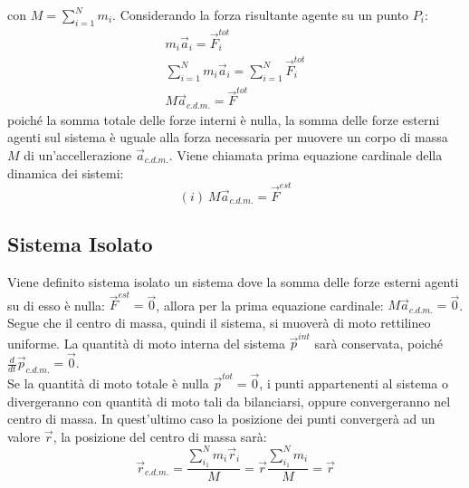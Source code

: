 \documentclass{article}
\numberwithin{equation}{subsection}
\begin{document}
con $M=\displaystyle\sum_{i=1}^{N}m_i$. 
Considerando la forza risultante agente su un punto $P_i$:
\begin{gather}
    m_i\vec{a}_i=\vec{F}_i^{tot}\\
    \displaystyle\sum_{i=1}^{N}m_i\vec{a}_i=\sum_{i=1}^{N}\vec{F}_i^{tot}\\
    M\vec{a}_{c.d.m.}=\vec{F}^{tot}
\end{gather}
poiché la somma totale delle forze interni è nulla, la somma 
delle forze esterni agenti sul 
sistema è uguale alla forza necessaria per muovere un corpo 
di massa $M$ di un'accellerazione $\vec{a}_{c.d.m.}$.
Viene chiamata prima equazione cardinale della dinamica dei 
sistemi:
\begin{equation}
    (i)\:M\vec{a}_{c.d.m.}=\vec{F}^{est}
\end{equation}

\subsection{Sistema Isolato}
Viene definito sistema isolato un sistema dove la somma delle 
forze esterni agenti su di esso è nulla: $\vec{F}^{est}=\vec{0}$, 
allora per la prima equazione cardinale: $M\vec{a}_{c.d.m.}=\vec{0}$. 
Segue che il centro di massa, quindi il sistema, si muoverà di moto rettilineo 
uniforme. La quantità di moto interna del sistema $\vec{p}^{int}$ 
sarà conservata, poiché $\displaystyle\frac{d}{dt}\vec{p}_{c.d.m.}=\vec{0}$.\\
Se la quantità di moto totale è nulla $\vec{p}^{tot}=\vec{0}$, 
i punti appartenenti al sistema o divergeranno con quantità di 
moto tali da bilanciarsi, oppure convergeranno nel centro di 
massa. In quest'ultimo caso la posizione dei punti convergerà 
ad un valore $\vec{r}$, la posizione del centro di massa sarà:
\begin{equation}
    \vec{r}_{c.d.m.}=\displaystyle\frac{\sum_{i_1}^{N}m_i\vec{r}_i}{M}=\vec{r}\frac{\sum_{i_1}^{N}m_i}{M}=\vec{r}
\end{equation}
\end{document}
